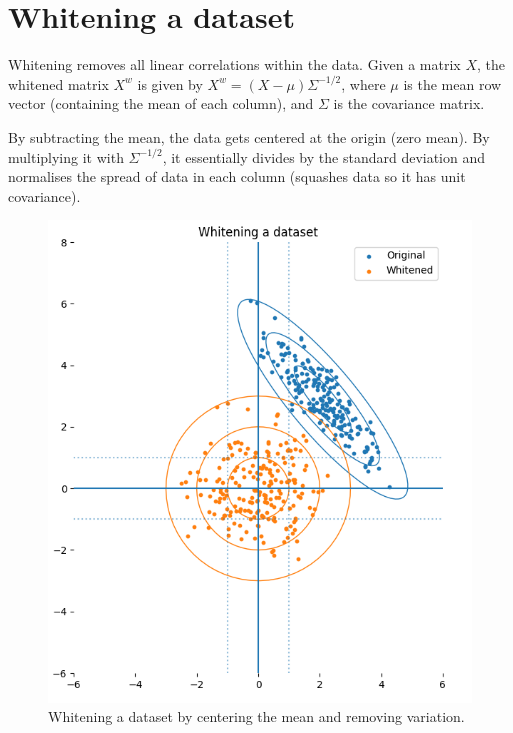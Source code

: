 \documentclass[a4paper, openany]{memoir}
\begin{document}
    \section{Whitening a dataset}
    Whitening removes all linear correlations within the data. Given a matrix $X$, the whitened matrix $X^w$ is given by $X^w = (X - \mu) \Sigma^{-1/2}$, where $\mu$ is the mean row vector (containing the mean of each column), and $\Sigma$ is the covariance matrix.

    By subtracting the mean, the data gets centered at the origin (zero mean). By multiplying it with $\Sigma^{-1/2}$, it essentially divides by the standard deviation and normalises the spread of data in each column (squashes data so it has unit covariance).
    \begin{figure}[H]
        \centering
        \includegraphics[scale=0.5]{src/3.34 Whitening dataset.png}
        \caption{Whitening a dataset by centering the mean and removing variation.}
    \end{figure}
\end{document}
